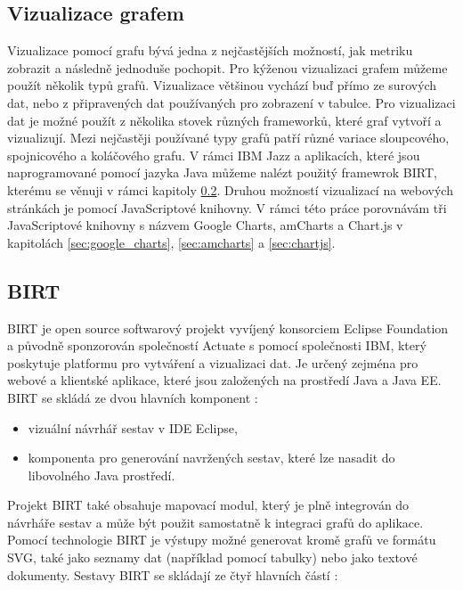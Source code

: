\documentclass[czech,master]{diploma}
\begin{document}
\subsection{Vizualizace grafem}
Vizualizace pomocí grafu bývá jedna z nejčastějších možností, jak metriku zobrazit a následně jednoduše pochopit. Pro kýženou vizualizaci grafem můžeme použít několik typů grafů. Vizualizace většinou vychází buď přímo ze surových dat, nebo z připravených dat používaných pro zobrazení v tabulce. Pro vizualizaci dat je možné použít z několika stovek různých frameworků, které graf vytvoří a vizualizují. Mezi nejčastěji používané typy grafů patří různé variace sloupcového, spojnicového a koláčového grafu. V rámci IBM Jazz a aplikacích, které jsou naprogramované pomocí jazyka Java můžeme nalézt použitý framewrok BIRT, kterému se věnuji v rámci kapitoly \ref{sec:birt}. Druhou možností vizualizací na webových stránkách je pomocí JavaScriptové knihovny. V rámci této práce porovnávám tři JavaScriptové knihovny s názvem Google Charts, amCharts a Chart.js v kapitolách \ref{sec:google_charts}, \ref{sec:amcharts} a \ref{sec:chartjs}.

\subsection{BIRT}
\label{sec:birt}
BIRT je open source softwarový projekt vyvíjený konsorciem Eclipse Foundation a původně sponzorován společností Actuate s pomocí společnosti IBM, který poskytuje platformu pro vytváření a vizualizaci dat. Je určený zejména pro webové a klientské aplikace, které jsou založených na prostředí Java a Java EE. BIRT se skládá ze dvou hlavních komponent \cite{ref:birt_about}:

\begin{itemize}
\item vizuální návrhář sestav v IDE Eclipse,
\item komponenta pro generování navržených sestav, které lze nasadit do libovolného Java prostředí.
\end{itemize}

Projekt BIRT také obsahuje mapovací modul, který je plně integrován do návrháře sestav a může být použit samostatně k integraci grafů do aplikace. Pomocí technologie BIRT je výstupy možné generovat kromě grafů ve formátu SVG, také jako seznamy dat (například pomocí tabulky) nebo jako textové dokumenty. Sestavy BIRT se skládají ze čtyř hlavních částí \cite{ref:birt_about}:
\end{document}
